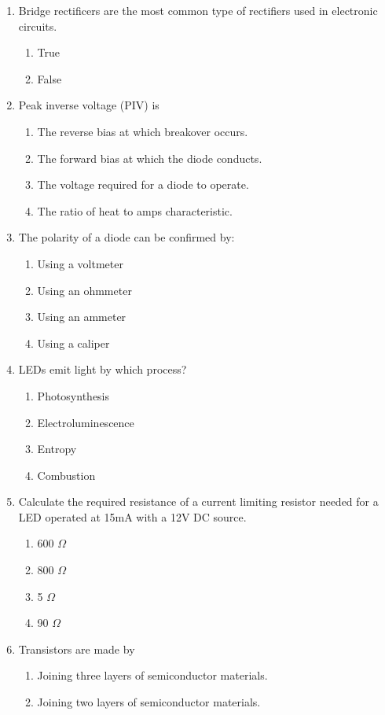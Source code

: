 \documentclass[10pt]{article}
\begin{document}
\begin{multicols}{2}
\begin{enumerate}
\item Bridge rectificers are the most common type of rectifiers used in electronic circuits.
	\begin{enumerate}
	\item True
	\item False
	\end{enumerate}
\item Peak inverse voltage (PIV) is
	\begin{enumerate}
	\item The reverse bias at which breakover occurs.
	\item The forward bias at which the diode conducts.
	\item The voltage required for a diode to operate.
	\item The ratio of heat to amps characteristic.
	\end{enumerate}
\item The polarity of a diode can be confirmed by:
	\begin{enumerate}
	\item Using a voltmeter
	\item Using an ohmmeter
	\item Using an ammeter
	\item Using a caliper
	\end{enumerate}
\item LEDs emit light by which process?
	\begin{enumerate}
	\item Photosynthesis
	\item Electroluminescence
	\item Entropy
	\item Combustion
	\end{enumerate}
\item Calculate the required resistance of a current limiting resistor needed for a LED operated at 15mA with a 12V DC source.
	\begin{enumerate}
	\item 600 $\Omega$
	\item 800 $\Omega$
	\item 5 $\Omega$
	\item 90 $\Omega$
	\end{enumerate}
\item Transistors are made by
	\begin{enumerate}
	\item Joining three layers of semiconductor materials.
	\item Joining two layers of semiconductor materials.

\end{enumerate}
\end{enumerate}
\end{multicols}
\end{document}

